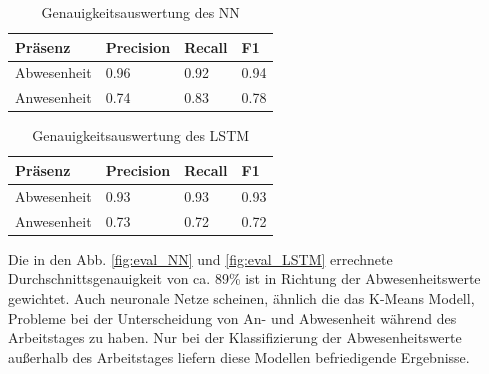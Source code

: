 \begin{table}[h]
    \centering
    \caption{Genauigkeitsauswertung des NN}
    \begin{tabular}{|p{2.5cm}||p{1.8cm}|p{1.5cm}|p{1.5cm}|}
        \hline
        \hfill Präsenz&\hfill Precision &\hfill Recall &\hfill F1\\
        \hline
        \hline
        \hfill Abwesenheit&\hfill 0.96&\hfill 0.92&\hfill 0.94\\
        \hfill Anwesenheit&\hfill 0.74&\hfill 0.83&\hfill 0.78\\
        \hline
    \end{tabular}          
    \label{tab:nn}
\end{table}
\begin{table}[h]
    \centering
    \caption{Genauigkeitsauswertung des LSTM}
    \begin{tabular}{|p{2.5cm}||p{1.8cm}|p{1.5cm}|p{1.5cm}|}
        \hline
        \hfill Präsenz&\hfill Precision &\hfill Recall &\hfill F1\\
        \hline
        \hline
        \hfill Abwesenheit&\hfill 0.93&\hfill 0.93&\hfill 0.93\\
        \hfill Anwesenheit&\hfill 0.73&\hfill 0.72&\hfill 0.72\\
        \hline
    \end{tabular}          
    \label{tab:LSTM}
\end{table}

Die in den Abb. \ref{fig:eval_NN} und \ref{fig:eval_LSTM} errechnete Durchschnittsgenauigkeit von ca. 89\%
ist in Richtung der Abwesenheitswerte gewichtet. Auch neuronale Netze scheinen, ähnlich die das K-Means Modell,
Probleme bei der Unterscheidung von An- und Abwesenheit während des Arbeitstages zu haben. Nur bei der 
Klassifizierung der Abwesenheitswerte außerhalb des Arbeitstages liefern diese Modellen befriedigende 
Ergebnisse.
\newpage

